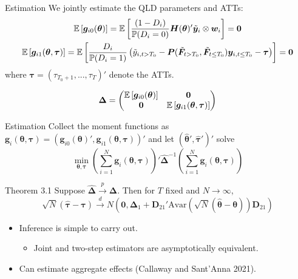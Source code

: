 \documentclass{beamer}
\newcommand{\1}{\mathds{1}} %
\newcommand{\convd}{\stackrel{d}{\rightarrow}} %
\newcommand{\plim}{\stackrel{p}{\rightarrow}} %
\begin{document}
\begin{frame}{Estimation}
    We jointly estimate the QLD parameters and ATTs:
    \begin{gather*}
        \mathbb{E}\left[ \bm g_{i0}(\bm \theta)\right] = \mathbb{E}\left[\frac{(1 - D_i)}{\mathbb{P}(D_i = 0)} \bm H(\bm \theta)' \tilde{\bm y}_i \otimes \bm w_i \right] = \bm 0\\
        \mathbb{E}\left[\bm g_{i1}(\bm \theta, \bm \tau)\right] = \mathbb{E}\left[\frac{D_i}{\mathbb{P}(D_i = 1)} \left( \tilde{y}_{i,t > T_0} - \bm P(\tilde{\bm F}_{t > T_0}, \tilde{\bm F}_{t \leq T_0}) \bm y_{i, t \leq T_0} - \bm \tau \right) \right] = \bm 0
    \end{gather*}
    where $\bm \tau = (\tau_{T_0 + 1},...,\tau_T)'$ denote the ATTs. 

    \vspace{.5cm}

    \begin{equation}
        \bm \Delta = 
        \begin{pmatrix}
            \mathbb{E}\left[\bm g_{i0}(\bm \theta)\right] & \bm 0\\
            \bm 0 & \mathbb{E}\left[\bm g_{i1}(\bm \theta, \bm \tau)\right]
        \end{pmatrix}
    \end{equation}
\end{frame}


\begin{frame}{Estimation}
    Collect the moment functions as $\bm g_i(\bm \theta, \bm \tau) = (\bm g_{i0}(\bm \theta)', \bm g_{i1}(\bm \theta, \bm \tau))'$ and let $(\widehat{\bm \theta}', \widehat{\bm \tau}')'$ solve
    \begin{equation*}
        \min_{\bm \theta, \bm \tau} \left( \sum_{i = 1}^N \bm g_i(\bm \theta, \bm \tau) \right)' \widehat{\bm \Delta}^{-1} \left( \sum_{i = 1}^N \bm g_i(\bm \theta, \bm \tau) \right)
    \end{equation*}

    \begin{block}{Theorem 3.1}
        Suppose $\widehat{\bm \Delta} \plim \bm \Delta$. Then for $T$ fixed and $N \rightarrow \infty$, 
        \begin{equation}
            \sqrt{N}(\widehat{\bm \tau} - \bm \tau) \convd N \left( \bm 0, \bm \Delta_1 + \bm D_{21}' \text{Avar}(\sqrt{N}(\widehat{\bm \theta} - \bm \theta)) \bm D_{21} \right)
        \end{equation}
    \end{block}
    \begin{itemize}
        \item Inference is simple to carry out.
        \begin{itemize}
            \item Joint and two-step estimators are asymptotically equivalent. 
        \end{itemize}
        \item Can estimate aggregate effects (Callaway and Sant'Anna 2021).
    \end{itemize}
\end{frame}
\end{document}
